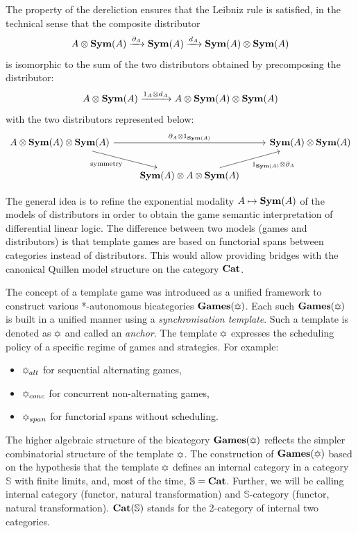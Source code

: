 \documentclass[8pt]{article}
\theoremstyle{definition}
\theoremstyle{definition}
\theoremstyle{definition}
\theoremstyle{definition}
\theoremstyle{definition}
\theoremstyle{definition}
\theoremstyle{definition}
\theoremstyle{definition}
\theoremstyle{definition}
\theoremstyle{definition}
\theoremstyle{definition}
\theoremstyle{definition}
\theoremstyle{definition}
\theoremstyle{definition}
\theoremstyle{question}
\begin{document}
The property of the dereliction ensures that the Leibniz rule is satisfied, in the technical sense that the composite distributor
\[
A \otimes {\bf Sym}(A) \xrightarrow{\partial_A} {\bf Sym}(A) \xrightarrow{d_A} {\bf Sym}(A) \otimes {\bf Sym}(A)
\]
is isomorphic to the sum of the two distributors obtained by precomposing the distributor:
\[
A \otimes {\bf Sym}(A) \xrightarrow{1_A \otimes d_A} A \otimes {\bf Sym}(A) \otimes {\bf Sym}(A)
\]
with the two distributors represented below:
\[
\begin{tikzcd}
  A \otimes {\bf Sym}(A) \otimes {\bf Sym}(A) \ar[rr, "\partial_A \otimes 1_{{\bf Sym}(A)}"] \ar[dr, "\operatorname{symmetry}"'] && {\bf Sym}(A) \otimes {\bf Sym}(A) \\
  & {\bf Sym}(A) \otimes A \otimes {\bf Sym}(A) \ar[ur, "1_{{\bf Sym}(A)} \otimes \partial_A"']
\end{tikzcd}
\]

The general idea is to refine the exponential modality $A \mapsto {\bf Sym}(A)$ of the models of distributors in order to obtain
the game semantic interpretation of differential linear logic. The difference between two models (games and distributors) is that
template games are based on functorial spans between categories instead of distributors. This would allow providing bridges with the canonical Quillen
model structure on the category ${\bf Cat}$.

The concept of a template game was introduced as a unified framework to construct various *-autonomous bicategories ${\bf Games}(\davidsstar)$.
Each such ${\bf Games}(\davidsstar)$ is built in a unified manner using a \emph{synchronisation template}. Such a template is denoted as 
$\davidsstar$ and called an \emph{anchor}. The template $\davidsstar$ expresses the scheduling policy of a specific regime of games
and strategies. For example:
\begin{itemize}
  \item $\davidsstar_{alt}$ for sequential alternating games, 
  \item $\davidsstar_{conc}$ for concurrent non-alternating games,
  \item $\davidsstar_{span}$ for functorial spans without scheduling.
\end{itemize}
The higher algebraic structure of the bicategory ${\bf Games}(\davidsstar)$ reflects the simpler combinatorial structure of the template $\davidsstar$.
The construction of ${\bf Games}(\davidsstar)$ based on the hypothesis that the template $\davidsstar$ defines an internal category in 
a category $\mathbb{S}$ with finite limits, and, most of the time, $\mathbb{S} = {\bf Cat}$. Further, we will be calling internal category
(functor, natural transformation) and $\mathbb{S}$-category (functor, natural transformation). ${\bf Cat}(\mathbb{S})$ stands for the 2-category 
of internal two categories.
\end{document}
